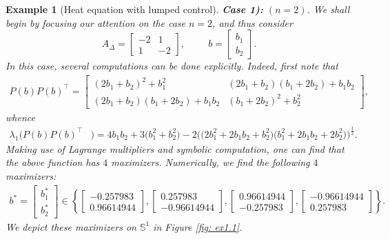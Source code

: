 \documentclass[11pt, a4paper, reqno]{amsart}
\theoremstyle{plain}
\numberwithin{equation}{section}
\newtheorem{example}{Example}[section]
\begin{document}
\begin{example}[Heat equation with lumped control]
	\noindent \textbf{Case 1):}
	$(n=2)$.
	We shall begin by focusing our attention on the case $n=2$, and thus consider 
	\begin{equation*}
	A_{\Delta} = 
	\begin{bmatrix} 
	-2 & 1\\
	1 & -2
	\end{bmatrix}, \hspace{1cm} b = \begin{bmatrix}b_1\\b_2\end{bmatrix}.
	\end{equation*} 
	In this case, several computations can be done explicitly. Indeed, first note that 
	\begin{align*}
	P(b)P(b)^\top=\begin{bmatrix}
	(2b_1+b_2)^2+b_1^2 & (2b_1+b_2)(b_1+2b_2)+b_1b_2 \\
	(2b_1+b_2)(b_1+2b_2)+b_1b_2 & (b_1+2b_2)^2+b_2^2
	\end{bmatrix},
	\end{align*}
	whence 
	\begin{align*}
	\lambda_1\Big(P(b)P(b)^\top&\Big)= 4b_1b_2+3\big(b_1^2+b_2^2\big)-2\Big(\big(2b_1^2+2b_1b_2+b_2^2\big)\big(b_1^2+2b_1b_2+2b_2^2\big)\Big)^{\frac{1}{2}}.
	\end{align*}
	Making use of Lagrange multipliers and symbolic computation, one can find that the above function has $4$ maximizers.
	Numerically, we find the following $4$ maximizers: 
	\begin{align} \label{eq: ex1.1.max}
	b^* = \begin{bmatrix} b_1^*\\ b_2^*\end{bmatrix} \in \left\{\begin{bmatrix} -0.257983\\0.96614944\end{bmatrix}, \begin{bmatrix} 0.257983\\-0.96614944\end{bmatrix}, \begin{bmatrix} 0.96614944\\-0.257983\end{bmatrix}, \begin{bmatrix} -0.96614944\\0.257983\end{bmatrix} \right\}.
	\end{align}
	We depict these maximizers on $\mathbb{S}^1$ in Figure \ref{fig: ex1.1}.

\end{example}
\end{document}
